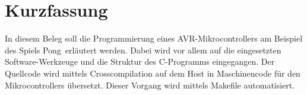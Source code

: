 
\section*{Kurzfassung}
In diesem Beleg soll die Programmierung eines AVR-Mikrocontrollers am Beispiel des Spiels \glqq Pong\grqq\ erläutert werden. Dabei wird vor allem auf die eingesetzten Software-Werkzeuge und die Struktur des C-Programms eingegangen. Der Quellcode wird mittels Crosscompilation auf dem Host in Maschinencode für den Mikrocontrollers übersetzt. Dieser Vorgang wird mittels Makefile automatisiert.